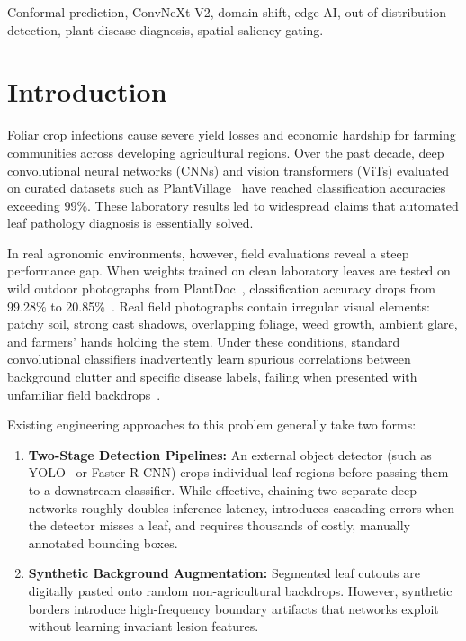 \documentclass[conference]{IEEEtran}
\begin{document}
\begin{IEEEkeywords}
Conformal prediction, ConvNeXt-V2, domain shift, edge AI, out-of-distribution detection, plant disease diagnosis, spatial saliency gating.
\end{IEEEkeywords}

\section{Introduction}
Foliar crop infections cause severe yield losses and economic hardship for farming communities across developing agricultural regions. Over the past decade, deep convolutional neural networks (CNNs) and vision transformers (ViTs) evaluated on curated datasets such as PlantVillage~\cite{mohanty2016using, ferentinos2018deep} have reached classification accuracies exceeding 99\%. These laboratory results led to widespread claims that automated leaf pathology diagnosis is essentially solved.

In real agronomic environments, however, field evaluations reveal a steep performance gap. When weights trained on clean laboratory leaves are tested on wild outdoor photographs from PlantDoc~\cite{singh2019plantdoc}, classification accuracy drops from 99.28\% to 20.85\%~\cite{barbedo2018factors}. Real field photographs contain irregular visual elements: patchy soil, strong cast shadows, overlapping foliage, weed growth, ambient glare, and farmers' hands holding the stem. Under these conditions, standard convolutional classifiers inadvertently learn spurious correlations between background clutter and specific disease labels, failing when presented with unfamiliar field backdrops~\cite{geirhos2020shortcut}.

Existing engineering approaches to this problem generally take two forms:
\begin{enumerate}
    \item \textbf{Two-Stage Detection Pipelines:} An external object detector (such as YOLO~\cite{redmon2016you} or Faster R-CNN) crops individual leaf regions before passing them to a downstream classifier. While effective, chaining two separate deep networks roughly doubles inference latency, introduces cascading errors when the detector misses a leaf, and requires thousands of costly, manually annotated bounding boxes.
    \item \textbf{Synthetic Background Augmentation:} Segmented leaf cutouts are digitally pasted onto random non-agricultural backdrops. However, synthetic borders introduce high-frequency boundary artifacts that networks exploit without learning invariant lesion features.
\end{enumerate}
\end{document}
